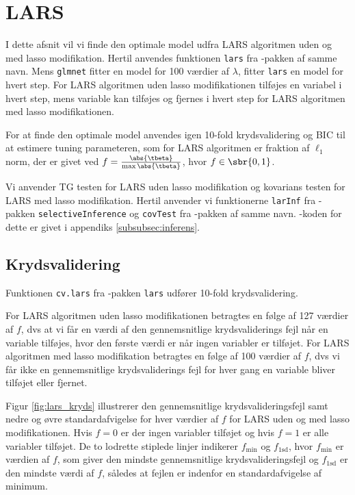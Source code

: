 \section{LARS}
I dette afsnit vil vi finde den optimale model udfra LARS algoritmen uden og med lasso modifikation. 
Hertil anvendes funktionen \texttt{lars} fra \Rlang-pakken af samme navn.
Mens \texttt{glmnet} fitter en model for 100 værdier af \(\lambda\), fitter \texttt{lars} en model for hvert step.
For LARS algoritmen uden lasso modifikationen tilføjes en variabel i hvert step, mens variable kan tilføjes og fjernes i hvert step for LARS algoritmen med lasso modifikationen.

For at finde den optimale model anvendes igen 10-fold krydsvalidering og BIC til at estimere tuning parameteren, som for LARS algoritmen er fraktion af \(\ell_1\) norm, der er givet ved \(f = \frac{\abs{\tbeta}}{\max \abs{\tbeta}}\), hvor \(f \in \sbr{0,1}\).


Vi anvender TG testen for LARS uden lasso modifikation og kovarians testen for LARS med lasso modifikation.   
Hertil anvender vi funktionerne \texttt{larInf} fra \Rlang-pakken \texttt{selectiveInference} og \texttt{covTest} fra \Rlang-pakken af samme navn. 
\Rlang-koden for dette er givet i appendiks \ref{subsubsec:inferens}.


\subsection{Krydsvalidering}
Funktionen \texttt{cv.lars} fra \Rlang-pakken \texttt{lars} udfører 10-fold krydsvalidering.

For LARS algoritmen uden lasso modifikationen betragtes en følge af 127 værdier af $f$, dvs at vi får en værdi af den gennemsnitlige krydsvaliderings fejl når en variable tilføjes, hvor den første værdi er når ingen variabler er tilføjet. 
For LARS algoritmen med lasso modifikation betragtes en følge af 100 værdier af $f$, dvs vi får ikke en gennemsnitlige krydsvaliderings fejl for hver gang en variable bliver tilføjet eller fjernet. 

Figur \ref{fig:lars_kryds} illustrerer den gennemsnitlige krydsvalideringsfejl samt nedre og øvre standardafvigelse for hver værdier af $f$ for LARS uden og med lasso modifikationen.
Hvis $f = 0$ er der ingen variabler tilføjet og hvis $f=1$ er alle variabler tilføjet. 
De to lodrette stiplede linjer indikerer \(f_{\text{min}}\) og \(f_\text{1sd}\), hvor \(f_{\text{min}}\) er værdien af \(f\), som giver den mindste gennemsnitlige krydsvalideringsfejl og \(f_\text{1sd}\) er den mindste værdi af \(f\), således at fejlen er indenfor en standardafvigelse af minimum. 


